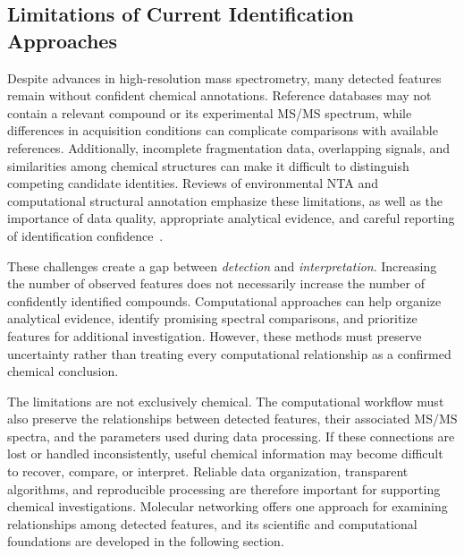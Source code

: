     \subsection{Limitations of Current Identification Approaches}\label{subsec:identification-limitations}


        Despite advances in high-resolution mass spectrometry, many detected features remain without confident chemical annotations. Reference databases may not contain a relevant compound or its experimental MS/MS spectrum, while differences in acquisition conditions can complicate comparisons with available references. Additionally, incomplete fragmentation data, overlapping signals, and similarities among chemical structures can make it difficult to distinguish competing candidate identities. Reviews of environmental NTA and computational structural annotation emphasize these limitations, as well as the importance of data quality, appropriate analytical evidence, and careful reporting of identification confidence~\cite{Schulze2020,Hupatz2025,Fisher2022}.

        These challenges create a gap between \emph{detection} and \emph{interpretation}. Increasing the number of observed features does not necessarily increase the number of confidently identified compounds. Computational approaches can help organize analytical evidence, identify promising spectral comparisons, and prioritize features for additional investigation. However, these methods must preserve uncertainty rather than treating every computational relationship as a confirmed chemical conclusion.

        The limitations are not exclusively chemical. The computational workflow must also preserve the relationships between detected features, their associated MS/MS spectra, and the parameters used during data processing. If these connections are lost or handled inconsistently, useful chemical information may become difficult to recover, compare, or interpret. Reliable data organization, transparent algorithms, and reproducible processing are therefore important for supporting chemical investigations. Molecular networking offers one approach for examining relationships among detected features, and its scientific and computational foundations are developed in the following section.

